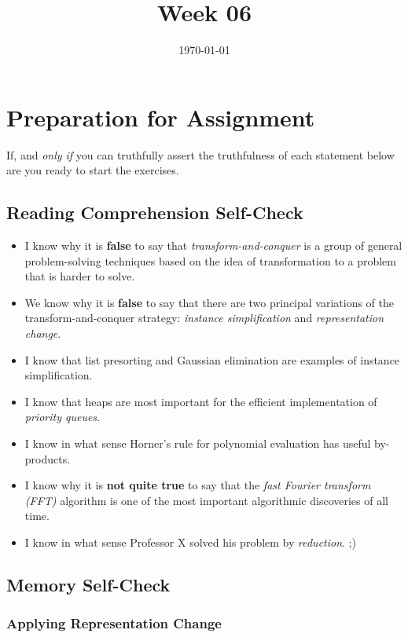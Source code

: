 \documentclass[12pt]{amsart}
\title{Week 06}
\date{\today}
\begin{document}
\maketitle

\section{Preparation for Assignment}
If, and \textit{only if} you can truthfully assert the truthfulness of each statement below are you ready to start the exercises.
\subsection {Reading Comprehension Self-Check}
\begin{itemize}
  \item I know why it is \textbf{false} to say that \textit{transform-and-conquer} is a group of general problem-solving techniques based on the idea of transformation to a problem that is harder to solve.
  \item We know why it is \textbf{false} to say that there are two principal variations of the transform-and-conquer strategy: \textit{instance simplification} and
    \textit{representation change}.
  \item I know that list presorting and Gaussian elimination are examples of instance simplification.
  \item I know that heaps are most important for the efficient implementation of \textit{priority queues}.
  \item I know in what sense Horner's rule for polynomial evaluation has useful by-products.
  \item I know why it is \textbf{not quite true} to say that the \textit{fast Fourier transform (FFT)} algorithm is one of the most important algorithmic discoveries of all time.
  \item I know in what sense Professor X solved his problem by \textit{reduction}. ;)

\end{itemize}
\subsection{Memory Self-Check}

\subsubsection{Applying Representation Change}
\end{document}
